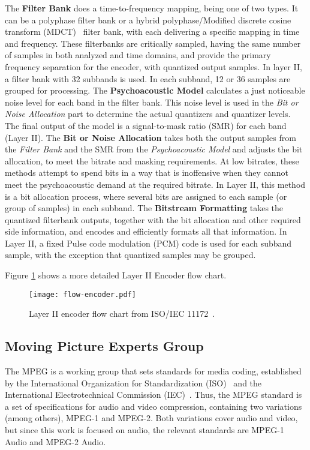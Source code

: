 The \textbf{Filter Bank} does a time-to-frequency mapping, being one of two types. It can be a polyphase filter bank or a hybrid polyphase/Modified discrete cosine transform (MDCT)~\cite{mdct} filter bank, with each delivering a specific mapping in time and frequency.
These filterbanks are critically sampled, having the same number of samples in both analyzed and time domains, and provide the primary frequency separation for the encoder, with quantized output samples. 
In layer II, a filter bank with 32 subbands is used. In each subband, 12 or 36 samples are grouped for processing.
The \textbf{Psychoacoustic Model} calculates a just noticeable noise level for each band in the filter bank. This noise level is used in the \textit{Bit or Noise Allocation} part to determine the actual quantizers and quantizer levels. 
The final output of the model is a signal-to-mask ratio (SMR) for each band (Layer II).
The \textbf{Bit or Noise Allocation} takes both the output samples from the \textit{Filter Bank} and the SMR from the \textit{Psychoacoustic Model} and adjusts the bit allocation, to meet the bitrate and masking requirements. At low bitrates, these methods attempt to spend bits in a way that is inoffensive when they cannot meet the psychoacoustic demand at the required bitrate.
In Layer II, this method is a bit allocation process, where several bits are assigned to each sample (or group of samples) in each subband.
The \textbf{Bitstream Formatting} takes the quantized filterbank outputs, together with the bit allocation and other required side information, and encodes and efficiently formats all that information. 
In Layer II, a fixed Pulse code modulation (PCM) code is used for each subband sample, with the exception that quantized samples may be grouped.

Figure \ref{fig:flow-encoder} shows a more detailed Layer II Encoder flow chart.

\begin{figure}[H]
\centerline{\texttt{[image: flow-encoder.pdf]}}
\caption{Layer II encoder flow chart from ISO/IEC 11172~\cite{11172}.}
\label{fig:flow-encoder}
\end{figure}

\subsection{Moving Picture Experts Group}

The MPEG is a working group that sets standards for media coding, established by the International Organization for Standardization (ISO)~\cite{iso} and the International Electrotechnical Commission (IEC)~\cite{iec}. Thus, the MPEG standard is a set of specifications for audio and video compression, containing two variations (among others), MPEG-1 and MPEG-2. Both variations cover audio and video, but since this work is focused on audio, the relevant standards are MPEG-1 Audio and MPEG-2 Audio.

